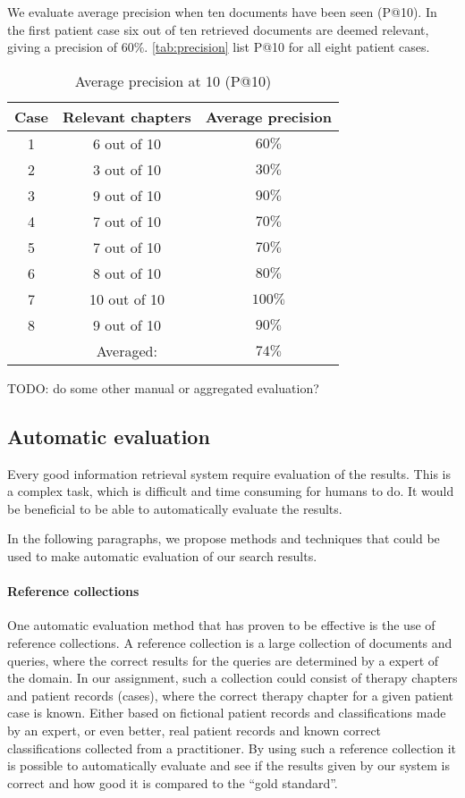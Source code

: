 \documentclass[a4paper, 11pt]{article}
\begin{document}
We evaluate average precision when ten documents have been seen (P@10). In the
first patient case six out of ten retrieved documents are deemed relevant,
giving a precision of \( 60\% \). \autoref{tab:precision} list P@10 for all
eight patient cases.
\begin{table}[htbp] \footnotesize \center
\caption{Average precision at 10 (P@10)\label{tab:precision}}
\begin{tabular}{c c c}
    \toprule
    Case & Relevant chapters & Average precision \\
    \midrule
	1 & 6 out of 10 & \( 60\% \) \\
	2 & 3 out of 10 & \( 30\% \) \\
	3 & 9 out of 10 & \( 90\% \) \\
	4 & 7 out of 10 & \( 70\% \) \\
	5 & 7 out of 10 & \( 70\% \) \\
	6 & 8 out of 10 & \( 80\% \) \\
	7 & 10 out of 10 & \( 100\% \) \\
	8 & 9 out of 10 & \( 90\% \) \\
    \midrule
	& Averaged: & \( 74\% \) \\
	\bottomrule
\end{tabular}
\end{table}

TODO: do some other manual or aggregated evaluation?

\subsection{Automatic evaluation}
Every good information retrieval system require evaluation of the results. This is a complex task, which is difficult and time consuming for humans to do. It would be beneficial to be able to automatically evaluate the results.

In the following paragraphs, we propose methods and techniques that could be used to make automatic evaluation of our search results.

\paragraph{Reference collections}
One automatic evaluation method that has proven to be effective is the use of reference collections. A reference collection is a large collection of documents and queries, where the correct results for the queries are determined by a expert of the domain.
In our assignment, such a collection could consist of therapy chapters and patient records (cases), where the correct therapy chapter for a given patient case is known. Either based on fictional patient records and classifications made by an expert, or even better, real patient records and known correct classifications collected from a practitioner. 
By using such a reference collection it is possible to automatically evaluate and see if the results given by our system is correct and how good it is compared to the ``gold standard''.
\end{document}
